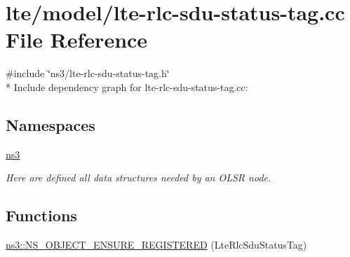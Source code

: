 \hypertarget{lte-rlc-sdu-status-tag_8cc}{}\section{lte/model/lte-\/rlc-\/sdu-\/status-\/tag.cc File Reference}
\label{lte-rlc-sdu-status-tag_8cc}
{\ttfamily \#include \char`\"{}ns3/lte-\/rlc-\/sdu-\/status-\/tag.\+h\char`\"{}}\\*
Include dependency graph for lte-\/rlc-\/sdu-\/status-\/tag.cc\+:
\subsection*{Namespaces}
\begin{DoxyCompactItemize}
\item 
 \hyperlink{namespacens3}{ns3}
\begin{DoxyCompactList}\small\item\em Here are defined all data structures needed by an O\+L\+SR node. \end{DoxyCompactList}\end{DoxyCompactItemize}
\subsection*{Functions}
\begin{DoxyCompactItemize}
\item 
\hyperlink{namespacens3_a0f166e190a2da808f2b054a36fa65206}{ns3\+::\+N\+S\+\_\+\+O\+B\+J\+E\+C\+T\+\_\+\+E\+N\+S\+U\+R\+E\+\_\+\+R\+E\+G\+I\+S\+T\+E\+R\+ED} (Lte\+Rlc\+Sdu\+Status\+Tag)
\end{DoxyCompactItemize}
